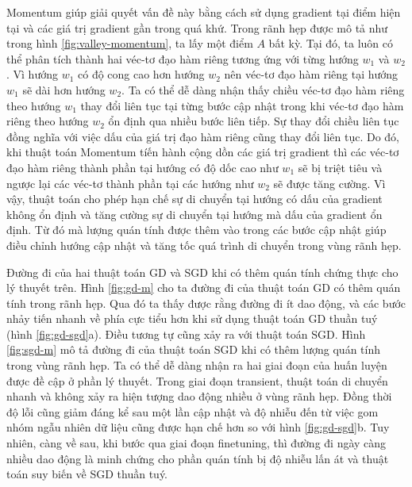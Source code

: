 Momentum giúp giải quyết vấn đề này bằng cách sử dụng gradient tại điểm hiện tại và các giá trị gradient gần trong quá khứ. Trong rãnh hẹp được mô tả như trong hình \ref{fig:valley-momentum}, ta lấy một điểm $A$ bất kỳ. Tại đó, ta luôn có thể phân tích thành hai véc-tơ đạo hàm riêng tương ứng với từng hướng $w_1$ và $w_2$. Vì hướng $w_1$ có độ cong cao hơn hướng $w_2$ nên véc-tơ đạo hàm riêng tại hướng $w_1$ sẽ dài hơn hướng $w_2$. Ta có thể dễ dàng nhận thấy chiều véc-tơ đạo hàm riêng theo hướng $w_1$ thay đổi liên tục tại từng bước cập nhật trong khi véc-tơ đạo hàm riêng theo hướng $w_2$ ổn định qua nhiều bước liên tiếp. Sự thay đổi chiều liên tục đồng nghĩa với việc dấu của giá trị đạo hàm riêng cũng thay đổi liên tục. Do đó, khi thuật toán Momentum tíến hành cộng dồn các giá trị gradient thì các véc-tơ đạo hàm riêng thành phần tại hướng có độ dốc cao như $w_1$ sẽ bị triệt tiêu và ngược lại các véc-tơ thành phần tại các hướng như $w_2$ sẽ được tăng cường. Vì vậy, thuật toán cho phép hạn chế sự di chuyển tại hướng có dấu của gradient không ổn định và tăng cường sự di chuyển tại hướng mà dấu của gradient ổn định. Từ đó mà lượng quán tính được thêm vào trong các bước cập nhật giúp điều chỉnh hướng cập nhật và tăng tốc quá trình di chuyển trong vùng rãnh hẹp.

Đường đi của hai thuật toán GD và SGD khi có thêm quán tính chứng thực cho lý thuyết trên. Hình \ref{fig:gd-m} cho ta đường đi của thuật toán GD có thêm quán tính trong rãnh hẹp. Qua đó ta thấy được rằng đường đi ít dao động, và các bước nhảy tiến nhanh về phía cực tiểu hơn khi sử dụng thuật toán GD thuần tuý (hình \ref{fig:gd-sgd}a). Điều tương tự cũng xảy ra với thuật toán SGD. Hình \ref{fig:sgd-m} mô tả đường đi của thuật toán SGD khi có thêm lượng quán tính trong vùng rãnh hẹp. Ta có thể dễ dàng nhận ra hai giai đoạn của huấn luyện được đề cập ở phần lý thuyết. Trong giai đoạn transient, thuật toán di chuyển nhanh và không xảy ra hiện tượng dao động nhiều ở vùng rãnh hẹp. Đồng thời độ lỗi cũng giảm đáng kể sau một lần cập nhật và độ nhiễu đến từ việc gom nhóm ngẫu nhiên dữ liệu cũng được hạn chế hơn so với hình \ref{fig:gd-sgd}b. Tuy nhiên, càng về sau, khi bước qua giai đoạn finetuning, thì đường đi ngày càng nhiều dao động là minh chứng cho phần quán tính bị độ nhiễu lấn át và thuật toán suy biến về SGD thuần tuý.


